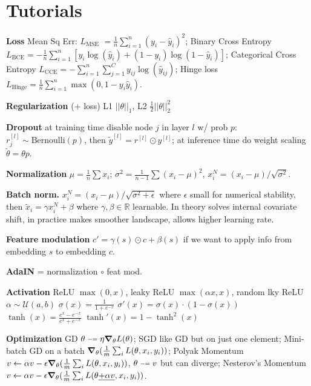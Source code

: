 \section{Tutorials}

\textbf{Loss} Mean Sq Err: $L_{\text{MSE}} $ $= \frac{1}{n} \sum_{i=1}^{n} (y_i - \hat{y}_i)^2$; Binary Cross Entropy $L_{\text{BCE}} = -\frac{1}{n} \sum_{i=1}^{n} \left[ y_i \log(\hat{y}_i) + (1 - y_i) \log(1 - \hat{y}_i) \right]$; Categorical Cross Entropy $L_{\text{CCE}} = -\sum_{i=1}^{n} \sum_{j=1}^{C} y_{ij} \log(\hat{y}_{ij})$; Hinge loss $L_{\text{Hinge}} = \frac{1}{n} \sum_{i=1}^{n} \max(0, 1 - y_i \hat{y}_i)$.

\textbf{Regularization} (+ loss) L1 $||\theta||_1$,  L2 $\tfrac{1}{2}||\theta||_2^2$

\textbf{Dropout} at training time disable node $j$ in layer $l$ w/ prob $p$: $r_j^{[l]} \sim \text{Bernoulli}(p)$, then $\tilde{y}^{[l]}=r^{[l]} \odot y^{[l]}$; at inference time do weight scaling $\tilde{\theta} = \theta p$.

\textbf{Normalization} $\mu = \tfrac{1}{n} \sum x_i$; $\sigma^2 = \tfrac{1}{n-1} \sum (x_i - \mu)^2$, $x_{i}^N = (x_i-\mu) / \sqrt{\sigma^2}$.

\textbf{Batch norm.} $x_{i}^N = (x_i-\mu) / \sqrt{\sigma^2 + \epsilon}$ where $\epsilon$ small for numerical stability, then $\tilde{x}_{i} = \gamma x_i^N + \beta$ where $\gamma, \beta \in \mathbb{R}$ learnable. In theory solves internal covariate shift, in practice makes smoother landscape, allows higher learning rate.

\textbf{Feature modulation} $c' = \gamma(s) \odot c + \beta(s)$ if we want to apply info from embedding $s$ to embedding $c$.

\textbf{AdaIN} = normalization $\circ$ feat mod.


\textbf{Activation} ReLU $\max(0,x)$, leaky ReLU $\max(\alpha x,x)$, random lky ReLU $\alpha \sim \mathcal{U}(a,b)$
\(\sigma(x) = \frac{1}{1+e^{-x}}\)  \(\sigma'(x) = \sigma(x) \cdot (1 - \sigma(x))\)
\(\tanh(x) = \frac{e^x - e^{-x}}{e^x + e^{-x}}\)  \(\tanh'(x) = 1-\tanh^2(x)\)

\newcommand{\minuseq}{\mathrel{\vcenter{\hbox{\scriptsize$-\!\!=$}}}}
\textbf{Optimization} GD $\theta \minuseq \eta \grad_\theta{L(\theta)}$; SGD like GD but on just one element; Mini-batch GD on a batch $\grad_{\theta} (\tfrac{1}{m} \sum_i L(\theta, x_i, y_i))$; Polyak Momentum $v \leftarrow \alpha v - \epsilon \grad_{\theta} (\tfrac{1}{m} \sum_i L(\theta, x_i, y_i))$, $\theta \minuseq v$ but can diverge; Nesterov's Momentum $v \leftarrow \alpha v - \epsilon \grad_{\theta} (\tfrac{1}{m} \sum_i L(\theta \text{\underline{$+ \alpha v$}}, x_i, y_i))$.

